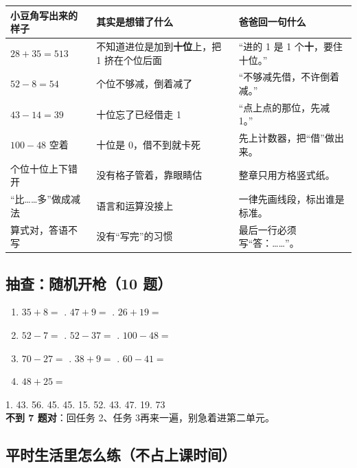 \begin{center}
\small
\begin{tabularx}{\linewidth}{@{}p{3.6cm}p{4.0cm}X@{}}
\toprule
\textbf{小豆角写出来的样子} & \textbf{其实是想错了什么} & \textbf{爸爸回一句什么} \\
\midrule
$28+35=513$ & 不知道进位是加到\textbf{十位}上，把 1 挤在个位后面 &
“进的 1 是 1 个\textbf{十}，要住十位。” \\
\addlinespace[2pt]
$52-8=54$ & 个位不够减，倒着减了 & “不够减先借，不许倒着减。” \\
\addlinespace[2pt]
$43-14=39$ & 十位忘了已经借走 1 & “点上点的那位，先减 1。” \\
\addlinespace[2pt]
$100-48$ 空着 & 十位是 0，借不到就卡死 & 先上计数器，把“借”做出来。 \\
\addlinespace[2pt]
个位十位上下错开 & 没有格子管着，靠眼睛估 & 整章只用方格竖式纸。 \\
\addlinespace[2pt]
“比……多”做成减法 & 语言和运算没接上 & 一律先画线段，标出谁是标准。 \\
\addlinespace[2pt]
算式对，答语不写 & 没有“写完”的习惯 & 最后一行必须写“答：……”。 \\
\bottomrule
\end{tabularx}
\end{center}

\subsection{抽查：随机开枪（10 题）}

\begin{enumerate}[label=\arabic*.,itemsep=4pt]
  \item $35+8=$ \blank {}. $47+9=$ \blank {}. $26+19=$ \blank
  \item $52-7=$ \blank {}. $52-37=$ \blank {}. $100-48=$ \blank
  \item $70-27=$ \blank {}. $38+9=$ \blank {}. $60-41=$ \blank
  \item $48+25=$ \blank
\end{enumerate}

\begin{ansbox}
1. 43. 56. 45. 45. 15. 52. 43. 47. 19. 73\\
\textbf{不到 7 题对}：回任务 2、任务 3再来一遍，别急着进第二单元。
\end{ansbox}

\subsection{平时生活里怎么练（不占上课时间）}

